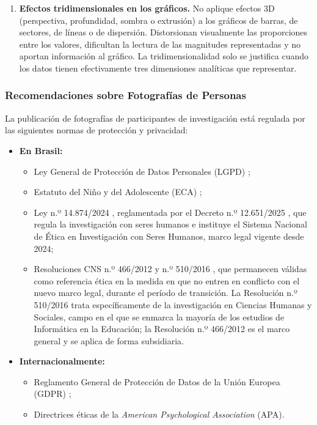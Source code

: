 \documentclass[spanish]{rbie2026}%
\begin{document}
\begin{enumerate}
  \item \textbf{Efectos tridimensionales en los gráficos.} No aplique efectos 3D (perspectiva, profundidad, sombra o extrusión) a los gráficos de barras, de sectores, de líneas o de dispersión. Distorsionan visualmente las proporciones entre los valores, dificultan la lectura de las magnitudes representadas y no aportan información al gráfico. La tridimensionalidad solo se justifica cuando los datos tienen efectivamente tres dimensiones analíticas que representar.
\end{enumerate}


\subsubsection{Recomendaciones sobre Fotografías de Personas}

La publicación de fotografías de participantes de investigación está regulada por las siguientes normas de protección y privacidad:

\begin{itemize}

  \item \textbf{En Brasil:}

  \begin{itemize}
    \item Ley General de Protección de Datos Personales (LGPD) \citep{LGPD2018};

    \item Estatuto del Niño y del Adolescente (ECA) \citep{ECA1990};

    \item Ley n.º 14.874/2024 \citep{brasil2024lei14874}, reglamentada por el Decreto n.º 12.651/2025 \citep{brasil2025decreto12651}, que regula la investigación con seres humanos e instituye el Sistema Nacional de Ética en Investigación con Seres Humanos, marco legal vigente desde 2024;

    \item Resoluciones CNS n.º 466/2012 \citep{cns2012resolucao466} y n.º 510/2016 \citep{cns2016resolucao510}, que permanecen válidas como referencia ética en la medida en que no entren en conflicto con el nuevo marco legal, durante el período de transición. La Resolución n.º 510/2016 trata específicamente de la investigación en Ciencias Humanas y Sociales, campo en el que se enmarca la mayoría de los estudios de Informática en la Educación; la Resolución n.º 466/2012 es el marco general y se aplica de forma subsidiaria.
  \end{itemize}

  \item \textbf{Internacionalmente:}

  \begin{itemize}
    \item Reglamento General de Protección de Datos de la Unión Europea (GDPR) \citep{GDPR2016};

    \item Directrices éticas de la \textit{American Psychological Association} (APA).
  \end{itemize}

\end{itemize}
\end{document}
